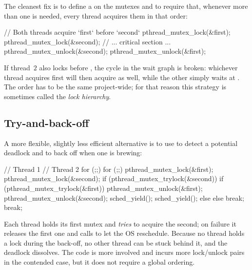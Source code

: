 The cleanest fix is to define a  on the mutexes and to require that, whenever more than one is needed, every thread acquires them in that order:

\begin{codeblock}[language=C]
// Both threads acquire `first` before `second`
pthread_mutex_lock(&first);
pthread_mutex_lock(&second);
//      ... critical section ...
pthread_mutex_unlock(&second);
pthread_mutex_unlock(&first);
\end{codeblock}

If thread~$2$ also locks  before , the cycle in the wait graph is broken: whichever thread acquires  first will then acquire  as well, while the other simply waits at . The order has to be the same project-wide; for that reason this strategy is sometimes called the \emph{lock hierarchy}.

\subsection{Try-and-back-off}

A more flexible, slightly less efficient alternative is to use  to detect a potential deadlock and to back off when one is brewing:

\begin{codeblock}[language=C]
// Thread 1                                   // Thread 2
for (;;) {                                    for (;;) {
    pthread_mutex_lock(&first);                   pthread_mutex_lock(&second);
    if (pthread_mutex_trylock(&second)) {         if (pthread_mutex_trylock(&first)) {
        pthread_mutex_unlock(&first);                 pthread_mutex_unlock(&second);
        sched_yield();                                sched_yield();
    } else {                                      } else {
        break;                                        break;
    }                                             }
}                                             }
\end{codeblock}

Each thread holds its first mutex and \emph{tries} to acquire the second; on failure it releases the first one and calls  to let the OS reschedule. Because no thread holds a lock during the back-off, no other thread can be stuck behind it, and the deadlock dissolves. The code is more involved and incurs more lock/unlock pairs in the contended case, but it does not require a global ordering.

